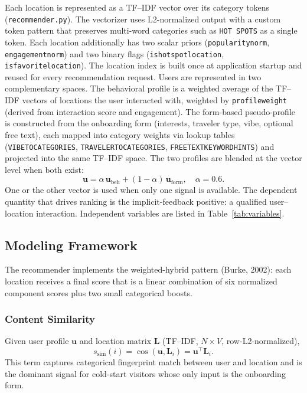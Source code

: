 \documentclass[12pt,letterpaper]{article}
\newcommand{\codeunderscore}{\discretionary{\textunderscore}{}{\textunderscore}}
\newcommand{\code}[1]{\begingroup\let\_\codeunderscore\texttt{\small #1}\endgroup}
\begin{document}
Each location is represented as a TF--IDF vector over its category
tokens (\code{recommender.py}). The vectorizer uses L2-normalized
output with a custom token pattern that preserves multi-word
categories such as \code{HOT SPOTS} as a single token. Each location
additionally has two scalar priors (\code{popularity\_norm},
\code{engagement\_norm}) and two binary flags
(\code{is\_hot\_spot\_location}, \code{is\_favorite\_location}). The
location index is built once at application startup and reused for
every recommendation request. Users are represented in two
complementary spaces. The behavioral profile is a weighted average of
the TF--IDF vectors of locations the user interacted with, weighted
by \code{profile\_weight} (derived from interaction score and
engagement). The form-based pseudo-profile is constructed from the
onboarding form (interests, traveler type, vibe, optional free text),
each mapped into category weights via lookup tables
(\code{VIBE\_TO\_CATEGORIES}, \code{TRAVELER\_TO\_CATEGORIES},
\code{FREE\_TEXT\_KEYWORD\_HINTS}) and projected into the same
TF--IDF space. The two profiles are blended at the vector level when
both exist:
\begin{equation}
  \bm{u} = \alpha\,\bm{u}_\text{beh} + (1 - \alpha)\,\bm{u}_\text{form},
  \quad \alpha = 0.6.
  \label{eq:blend}
\end{equation}
One or the other vector is used when only one signal is available.
The dependent quantity that drives ranking is the implicit-feedback
positive: a qualified user--location interaction. Independent
variables are listed in Table~\ref{tab:variables}.

\subsection{Modeling Framework}\label{sec:hybrid}

The recommender implements the weighted-hybrid pattern (Burke, 2002):
each location receives a final score that is a linear combination of
six normalized component scores plus two small categorical boosts.

\subsubsection*{Content Similarity}
Given user profile $\bm{u}$ and location matrix $\bm{L}$ (TF--IDF,
$N \times V$, row-L2-normalized),
\begin{equation}
  s_\text{sim}(i) = \cos(\bm{u}, \bm{L}_i) = \bm{u}^\top \bm{L}_i.
\end{equation}
This term captures categorical fingerprint match between user and
location and is the dominant signal for cold-start visitors whose
only input is the onboarding form.
\end{document}
